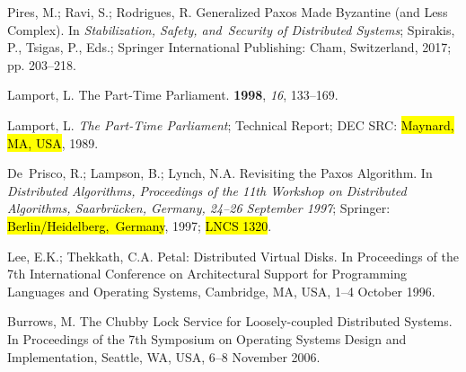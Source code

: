 \documentclass[algorithms,article,accept,moreauthors,pdftex,10pt,a4paper]{Definitions/mdpi}
\begin{document}


\begin{thebibliography}{999}

Pires, M.; Ravi, S.; Rodrigues, R.
\newblock Generalized Paxos Made Byzantine (and Less Complex).
\newblock In \emph{Stabilization, Safety, and~Security of Distributed Systems};
Spirakis, P., Tsigas, P., Eds.; Springer International Publishing: Cham, Switzerland, 
2017; pp. 203--218.

Lamport, L.
\newblock The {Part-Time} Parliament.
 {\bf 1998}, {\em
16}, 133--169.

Lamport, L.
\newblock \emph{The Part-Time Parliament};
\newblock Technical Report; DEC SRC: \hl{Maynard, MA, USA}, 1989.

De~Prisco, R.; Lampson, B.; Lynch, N.A.
\newblock Revisiting the {Paxos} Algorithm.
\newblock In \emph{Distributed Algorithms, Proceedings of the 11th Workshop on Distributed Algorithms, Saarbrücken, Germany, 24--26 September 1997}; Springer: \hl{\mbox{Berlin/Heidelberg, Germany}}, %
1997; \hl{LNCS 1320}. %

Lee, E.K.; Thekkath, C.A.
\newblock Petal: Distributed Virtual Disks.
\newblock In Proceedings of the 7th International Conference on Architectural Support for Programming
Languages and Operating Systems, Cambridge, MA, USA, 1--4 October 1996.

Burrows, M.
\newblock The Chubby Lock Service for Loosely-coupled Distributed Systems.
\newblock In Proceedings of the 7th Symposium on Operating Systems Design and Implementation, Seattle, WA, USA, 6--8 November 2006.


\end{thebibliography}
\end{document}

